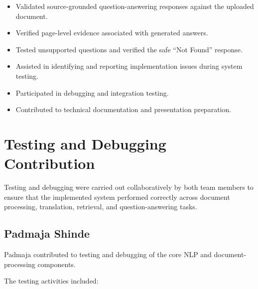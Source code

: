 \begin{itemize}
    \item Validated source-grounded question-answering responses
    against the uploaded document.

    \item Verified page-level evidence associated with generated
    answers.

    \item Tested unsupported questions and verified the safe
    ``Not Found'' response.

    \item Assisted in identifying and reporting implementation
    issues during system testing.

    \item Participated in debugging and integration testing.

    \item Contributed to technical documentation and presentation
    preparation.

\end{itemize}

\section{Testing and Debugging Contribution}

Testing and debugging were carried out collaboratively by both team
members to ensure that the implemented system performed correctly
across document processing, translation, retrieval, and
question-answering tasks.

\subsection{Padmaja Shinde}

Padmaja contributed to testing and debugging of the core NLP and
document-processing components.

The testing activities included:

